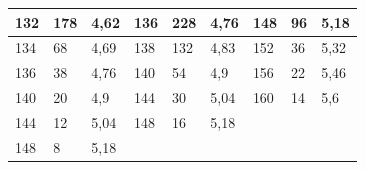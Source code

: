 \documentclass[a4paper,12pt]{article}
\begin{document}
\begin{table}[h]
\begin{center}
\begin{tabular}{|lll|lll|lll|}
\multicolumn{1}{|l|}{132}                                              & \multicolumn{1}{l|}{178}                      & 4,62                     & \multicolumn{1}{l|}{136}                      & \multicolumn{1}{l|}{228}                      & 4,76                     & \multicolumn{1}{l|}{148}                      & \multicolumn{1}{l|}{96}                       & 5,18                     \\ \hline
\multicolumn{1}{|l|}{134}                                              & \multicolumn{1}{l|}{68}                       & 4,69                     & \multicolumn{1}{l|}{138}                      & \multicolumn{1}{l|}{132}                      & 4,83                     & \multicolumn{1}{l|}{152}                      & \multicolumn{1}{l|}{36}                       & 5,32                     \\ \hline
\multicolumn{1}{|l|}{136}                                              & \multicolumn{1}{l|}{38}                       & 4,76                     & \multicolumn{1}{l|}{140}                      & \multicolumn{1}{l|}{54}                       & 4,9                      & \multicolumn{1}{l|}{156}                      & \multicolumn{1}{l|}{22}                       & 5,46                     \\ \hline
\multicolumn{1}{|l|}{140}                                              & \multicolumn{1}{l|}{20}                       & 4,9                      & \multicolumn{1}{l|}{144}                      & \multicolumn{1}{l|}{30}                       & 5,04                     & \multicolumn{1}{l|}{160}                      & \multicolumn{1}{l|}{14}                       & 5,6                      \\ \hline
\multicolumn{1}{|l|}{144}                                              & \multicolumn{1}{l|}{12}                       & 5,04                     & \multicolumn{1}{l|}{148}                      & \multicolumn{1}{l|}{16}                       & 5,18                     & \multicolumn{1}{l|}{}                         & \multicolumn{1}{l|}{}                         &                          \\ \hline
\multicolumn{1}{|l|}{148}                                              & \multicolumn{1}{l|}{8}                        & 5,18                     & \multicolumn{1}{l|}{}                         & \multicolumn{1}{l|}{}                         &                          & \multicolumn{1}{l|}{}                         & \multicolumn{1}{l|}{}                         &                          \\ \hline
\end{tabular}
\end{center}
\end{table}
\end{document}
